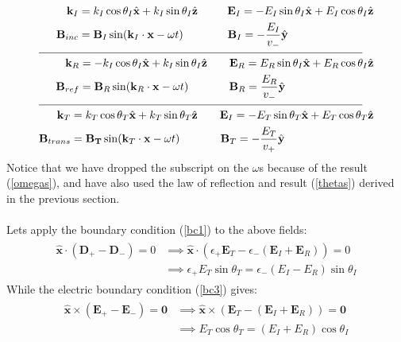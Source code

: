 \documentclass[a4paper]{article}
\numberwithin{equation}{section}
\begin{document}
\begin{align}
\begin{split}
\mathbf{k}_I &= k_I \cos \theta_I \hat{\mathbf{x}} + k_I \sin \theta_I \hat{\mathbf{z}} \qquad \ \ \mathbf{E}_I = -E_I \sin \theta_I \hat{\mathbf{x}} + E_I \cos \theta_I \hat{\mathbf{z}} \\
\mathbf{B}_{inc} &= \mathbf{B}_I \sin(\mathbf{k}_I \cdot \mathbf{x}- \omega t) \qquad \qquad \mathbf{B}_I = -\frac{E_I}{v_-}\hat{\mathbf{y}}
\end{split}
\\
\cline{1-2}
\begin{split}
\mathbf{k}_R &= -k_I \cos \theta_I \hat{\mathbf{x}} + k_I \sin \theta_I \hat{\mathbf{z}} \qquad \mathbf{E}_R = E_R \sin \theta_I \hat{\mathbf{x}} + E_R \cos \theta_I \hat{\mathbf{z}} \\
\mathbf{B}_{ref} &= \mathbf{B}_R \sin(\mathbf{k}_R \cdot \mathbf{x}- \omega t) \qquad \quad \ \ \mathbf{B}_R = \frac{E_R}{v_-}\hat{\mathbf{y}}
\end{split}
\\
\cline{1-2}
\begin{split}
\mathbf{k}_T &= k_T \cos \theta_T \hat{\mathbf{x}} + k_T \sin \theta_T \hat{\mathbf{z}} \qquad \mathbf{E}_I = -E_T \sin \theta_T \hat{\mathbf{x}} + E_T \cos \theta_T \hat{\mathbf{z}} \\
\mathbf{B}_{trans} &= \mathbf{B_T} \sin(\mathbf{k}_T \cdot \mathbf{x}- \omega t) \qquad \quad \ \ \mathbf{B}_T = -\frac{E_T}{v_+}\hat{\mathbf{y}}
\end{split}
\end{align}
Notice that we have dropped the subscript on the $\omega$s because of the result (\ref{omegas}), and have also used the law of reflection and result (\ref{thetas}) derived in the previous section.\\
\\
Lets apply the boundary condition (\ref{bc1}) to the above fields:
\begin{align}
\begin{split} \label{D condition}
\hat{\mathbf{x}} \cdot (\mathbf{D}_+-\mathbf{D}_-) = 0 &\implies \hat{\mathbf{x}} \cdot ( \epsilon_+ \mathbf{E}_T - \epsilon_-(\mathbf{E}_I + \mathbf{E}_R)) = 0 \\
& \implies \epsilon_+ E_T \sin \theta_T = \epsilon_-(E_I-E_R)\sin \theta_I
\end{split}
\end{align}
While the electric boundary condition (\ref{bc3}) gives:
\begin{align}
\begin{split} \label{E condition}
\hat{\mathbf{x}} \times (\mathbf{E}_+-\mathbf{E}_-) = \mathbf{0} &\implies \hat{\mathbf{x}} \times (\mathbf{E}_T - (\mathbf{E}_I+\mathbf{E}_R)) = \mathbf{0} \\
&\implies E_T \cos \theta_T = (E_I + E_R) \cos \theta_I
\end{split}
\end{align}
\end{document}
